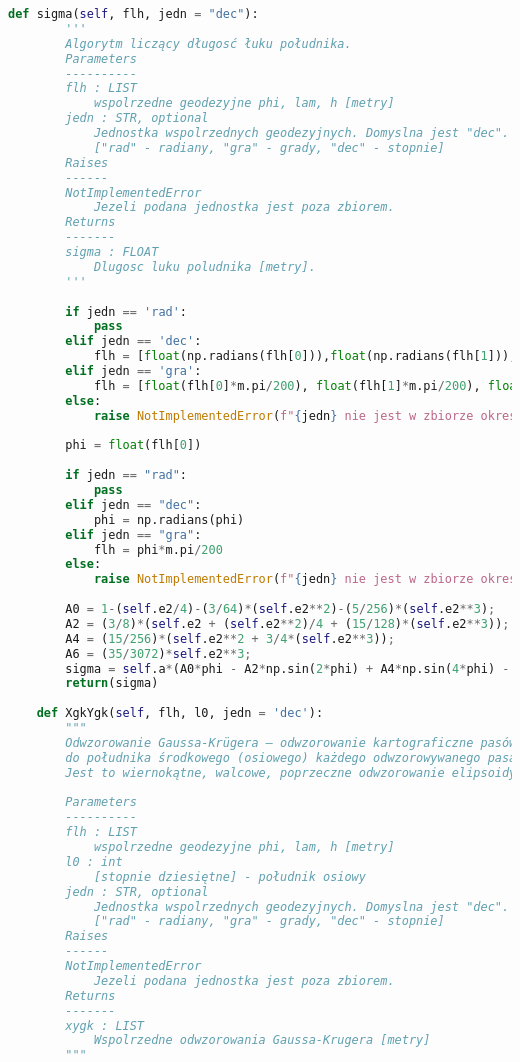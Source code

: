 \begin{lstlisting}[caption={\emph{Treść programu}}, language=Python]
    def sigma(self, flh, jedn = "dec"):
        '''
        Algorytm liczący długosć łuku południka.
        Parameters
        ----------
        flh : LIST
            wspolrzedne geodezyjne phi, lam, h [metry]
        jedn : STR, optional
            Jednostka wspolrzednych geodezyjnych. Domyslna jest "dec".
            ["rad" - radiany, "gra" - grady, "dec" - stopnie]
        Raises
        ------
        NotImplementedError
            Jezeli podana jednostka jest poza zbiorem.
        Returns
        -------
        sigma : FLOAT
            Dlugosc luku poludnika [metry].
        '''
        
        if jedn == 'rad':
            pass
        elif jedn == 'dec':
            flh = [float(np.radians(flh[0])),float(np.radians(flh[1])),float(flh[2])]
        elif jedn == 'gra':
            flh = [float(flh[0]*m.pi/200), float(flh[1]*m.pi/200), float(flh[2])]
        else:
            raise NotImplementedError(f"{jedn} nie jest w zbiorze okreslen")
        
        phi = float(flh[0])
        
        if jedn == "rad":
            pass
        elif jedn == "dec":
            phi = np.radians(phi)
        elif jedn == "gra":
            flh = phi*m.pi/200
        else:
            raise NotImplementedError(f"{jedn} nie jest w zbiorze okreslen")
        
        A0 = 1-(self.e2/4)-(3/64)*(self.e2**2)-(5/256)*(self.e2**3);
        A2 = (3/8)*(self.e2 + (self.e2**2)/4 + (15/128)*(self.e2**3));
        A4 = (15/256)*(self.e2**2 + 3/4*(self.e2**3));
        A6 = (35/3072)*self.e2**3;
        sigma = self.a*(A0*phi - A2*np.sin(2*phi) + A4*np.sin(4*phi) - A6*np.sin(6*phi));
        return(sigma)
    
    def XgkYgk(self, flh, l0, jedn = 'dec'):
        """
        Odwzorowanie Gaussa-Krügera – odwzorowanie kartograficzne pasów południkowych na pobocznicę walca stycznego
        do południka środkowego (osiowego) każdego odwzorowywanego pasa.
        Jest to wiernokątne, walcowe, poprzeczne odwzorowanie elipsoidy, w którym każdy pas odwzorowuje się oddzielnie.
        
        Parameters
        ----------
        flh : LIST
            wspolrzedne geodezyjne phi, lam, h [metry]
        l0 : int
            [stopnie dziesiętne] - południk osiowy
        jedn : STR, optional
            Jednostka wspolrzednych geodezyjnych. Domyslna jest "dec".
            ["rad" - radiany, "gra" - grady, "dec" - stopnie]
        Raises
        ------
        NotImplementedError
            Jezeli podana jednostka jest poza zbiorem.
        Returns
        -------
        xygk : LIST
            Wspolrzedne odwzorowania Gaussa-Krugera [metry]
        """
        

\end{lstlisting}
